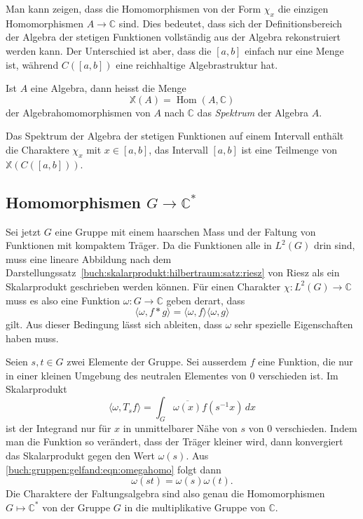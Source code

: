 Man kann zeigen, dass die Homomorphismen von der Form $\chi_x$ 
die einzigen Homomorphismen $A\to\mathbb{C}$ sind.
Dies bedeutet, dass sich der Definitionsbereich der Algebra der
stetigen Funktionen vollständig aus der Algebra rekonstruiert werden 
kann.
Der Unterschied ist aber, dass die $[a,b]$ einfach nur eine Menge ist,
während $C([a,b])$ eine reichhaltige Algebrastruktur hat.

\begin{definition}[Spektrum]
\label{buch:gruppen:gelfand:def:spektrum}
Ist $A$ eine Algebra, dann heisst die Menge
\[
\mathbb{X}(A)
=
\operatorname{Hom}(A,\mathbb{C})
\]
der Algebrahomomorphismen von $A$ nach $\mathbb{C}$ das
{\em Spektrum} der Algebra $A$.
\end{definition}

Das Spektrum der Algebra der stetigen Funktionen auf einem Intervall
enthält die Charaktere $\chi_x$ mit $x\in [a,b]$, das Intervall
$[a,b]$ ist eine Teilmenge von $\mathbb{X}(C([a,b]))$.

%
%
\subsection{Homomorphismen $G\to \mathbb{C}^*$}
Sei jetzt $G$ eine Gruppe mit einem haarschen Mass und der Faltung 
von Funktionen mit kompaktem Träger.
Da die Funktionen alle in $L^2(G)$ drin sind, muss eine lineare
Abbildung nach dem
Darstellungssatz~\ref{buch:skalarprodukt:hilbertraum:satz:riesz}
von Riesz als ein Skalarprodukt geschrieben werden können.
Für einen Charakter $\chi\colon L^2(G)\to\mathbb{C}$ muss es also eine
Funktion $\omega\colon G\to\mathbb{C}$ geben derart, dass
\begin{equation}
\langle \omega, f*g\rangle
=
\langle \omega, f\rangle
\langle \omega, g\rangle
\label{buch:gruppen:gelfand:eqn:omegahomo}
\end{equation}
gilt.
Aus dieser Bedingung lässt sich ableiten, dass $\omega$ sehr spezielle
Eigenschaften haben muss.

Seien $s,t\in G$ zwei Elemente der Gruppe.
Sei ausserdem $f$ eine Funktion, die nur in einer kleinen Umgebung 
des neutralen Elementes von $0$ verschieden ist.
Im Skalarprodukt
\[
\langle \omega, T_{s}f\rangle
=
\int_{G} \overline{\omega(x)} f(s^{-1}x) \,dx
\]
ist der Integrand nur für $x$ in unmittelbarer Nähe von $s$  von
$0$ verschieden.
Indem man die Funktion so verändert, dass der Träger kleiner wird,
dann konvergiert das Skalarprodukt gegen den Wert $\omega(s)$.
Aus \eqref{buch:gruppen:gelfand:eqn:omegahomo} folgt dann
\[
\omega(st) = \omega(s)\omega(t).
\]
Die Charaktere der Faltungsalgebra sind also genau die Homomorphismen
$G\mapsto\mathbb{C}^*$ von der Gruppe $G$ in die multiplikative
Gruppe von $\mathbb{C}$.

